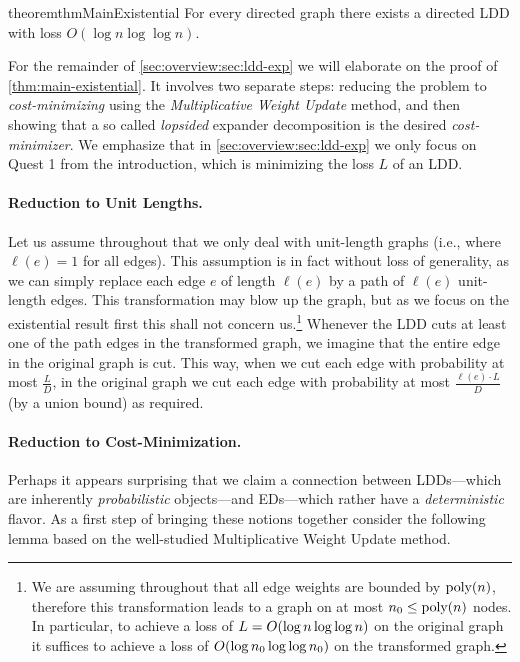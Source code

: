 \documentclass[letterpaper,11pt]{article}
\begin{document}
\begin{restatable}{theorem}{thmMainExistential} \label{thm:main-existential}
	For every directed graph there exists a directed LDD with loss $O(\log n \log \log n)$.
\end{restatable}

For the remainder of \cref{sec:overview:sec:ldd-exp} we will elaborate on the proof of \cref{thm:main-existential}. It involves two separate steps: reducing the problem to \emph{cost-minimizing} using the \emph{Multiplicative Weight Update} method, and then showing that a so called \emph{lopsided} expander decomposition is the desired \emph{cost-minimizer}. We emphasize that in \cref{sec:overview:sec:ldd-exp} we only focus on Quest 1 from the introduction, which is minimizing the loss $L$ of an LDD.

\paragraph{Reduction to Unit Lengths.}
Let us assume throughout that we only deal with unit-length graphs (i.e., where $\ell(e) = 1$ for all edges). This assumption is in fact without loss of generality, as we can simply replace each edge $e$ of length $\ell(e)$ by a path of $\ell(e)$ unit-length edges. This transformation may blow up the graph, but as we focus on the existential result first this shall not concern us.\footnote{We are assuming throughout that all edge weights are bounded by $\operatorname{\text{{\rm poly}}}(n)$, therefore this transformation leads to a graph on at most $n_0 \leq \operatorname{\text{{\rm poly}}}(n)$ nodes. In particular, to achieve a loss of $L = O(\log n \log \log n)$ on the original graph it suffices to achieve a loss of $O(\log n_0 \log\log n_0)$ on the transformed graph.} Whenever the LDD cuts at least one of the path edges in the transformed graph, we imagine that the entire edge in the original graph is cut. This way, when we cut each edge with probability at most $\frac{L}{D}$, in the original graph we cut each edge with probability at most $\frac{\ell(e) \cdot L}{D}$ (by a union bound) as required.

\paragraph{Reduction to Cost-Minimization.}
Perhaps it appears surprising that we claim a connection between LDDs---which are inherently \emph{probabilistic} objects---and EDs---which rather have a \emph{deterministic} flavor. As a first step of bringing these notions together consider the following lemma based on the well-studied Multiplicative Weight Update \cite{AroraHazanKale12} method.
 
\end{document}
